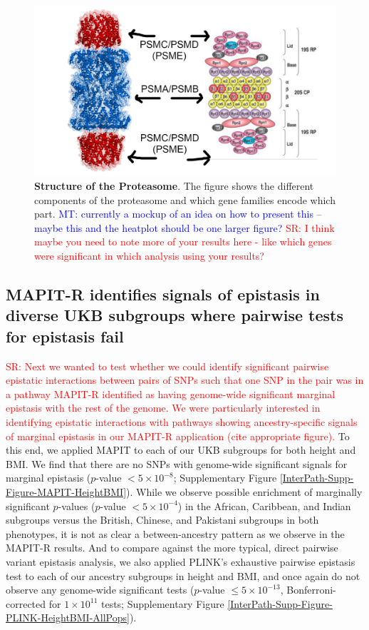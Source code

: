 \documentclass[12pt,a4paper]{article}
\begin{document}
\begin{figure}[htb]
\centering
\includegraphics[scale=.2]{Images/Main/MockUp1.png}
\caption[TBD]{\textbf{Structure of the Proteasome}. The figure shows the different components of the proteasome and which gene families encode which part. \textcolor{blue}{MT: currently a mockup of an idea on how to present this -- maybe this and the heatplot should be one larger figure? } \textcolor{red}{SR: I think maybe you need to note more of your results here - like which genes were significant in which analysis using your results?}
}
\label{InterPath-Main-Figure-Proteasome-Schematic}
\end{figure}


\subsection{MAPIT-R identifies signals of epistasis in diverse UKB subgroups where pairwise tests for epistasis fail}\label{InterPath-Results-SNPEpistasis}

\textcolor{red}{SR: Next we wanted to test whether we could identify significant pairwise epistatic interactions between pairs of SNPs such that one SNP in the pair was in a pathway MAPIT-R identified as having genome-wide significant marginal epistasis with the rest of the genome. We were particularly interested in identifying epistatic interactions with pathways showing ancestry-specific signals of marginal epistasis in our MAPIT-R application (cite appropriate figure).} To this end, we applied MAPIT to each of our UKB subgroups for both height and BMI. We find that there are no SNPs with genome-wide significant signals for marginal epistasis ($p$-value $< 5\times10^{-8}$; Supplementary Figure \ref{InterPath-Supp-Figure-MAPIT-HeightBMI}). While we observe possible enrichment of marginally significant $p$-values ($p$-value $< 5\times10^{-4}$) in the African, Caribbean, and Indian subgroups versus the British, Chinese, and Pakistani subgroups in both phenotypes, it is not as clear a between-ancestry pattern as we observe in the MAPIT-R results. And to compare against the more typical, direct pairwise variant epistasis analysis, we also applied PLINK's exhaustive pairwise epistasis test \citep{Purcell2007} to each of our ancestry subgroups in height and BMI, and once again do not observe any genome-wide significant tests ($p$-value $\leq 5\times10^{-13}$, Bonferroni-corrected for $1\times10^{11}$ tests; Supplementary Figure \ref{InterPath-Supp-Figure-PLINK-HeightBMI-AllPops}).
\end{document}
